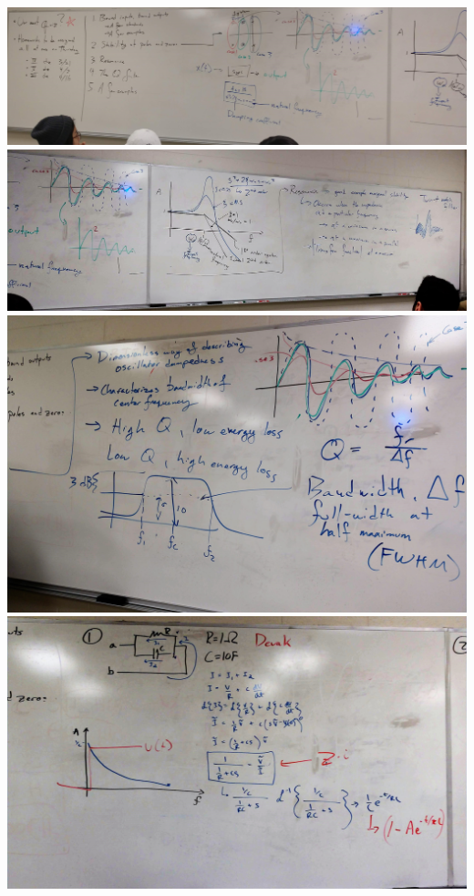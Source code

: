 \documentclass[11pt]{book}
\begin{document}
\includegraphics[width=\textwidth]{figures/3-12-19_Fig.1.jpg}
\\
\includegraphics[width=\textwidth]{figures/3-12-19_Fig.2.jpg}
\\
\includegraphics[width=\textwidth]{figures/3-12-19_Fig.3.jpg}
\\
\includegraphics[width=\textwidth]{figures/3-12-19_Fig.4.jpg}
\end{document}
